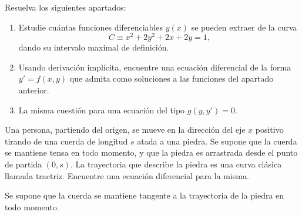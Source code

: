 \begin{ejercicio} Resuelva los siguientes apartados:
    \begin{enumerate}
        \item Estudie cuántas funciones diferenciables \(y(x)\) se pueden extraer de la curva
        \begin{equation*}
            C \equiv x^2 + 2y^2 + 2x + 2y = 1,
        \end{equation*}
        dando su intervalo maximal de definición.

        \item Usando derivación implícita, encuentre una ecuación diferencial de la forma \(y' = f(x, y)\) que admita como soluciones a las funciones del apartado anterior.
        \item La misma cuestión para una ecuación del tipo \(g(y, y') = 0\).
    \end{enumerate}
\end{ejercicio}


\begin{ejercicio}
    Una persona, partiendo del origen, se mueve en la dirección del eje \(x\) positivo tirando de una cuerda de longitud \(s\) atada a una piedra.
    Se supone que la cuerda se mantiene tensa en todo momento, y que la piedra es arrastrada desde el punto de partida \((0, s)\).
    La trayectoria que describe la piedra es una curva clásica llamada tractriz.
    Encuentre una ecuación diferencial para la misma.
    \begin{observacion}
        Se supone que la cuerda se mantiene tangente a la trayectoria de la piedra en todo momento.
    \end{observacion}
\end{ejercicio}


